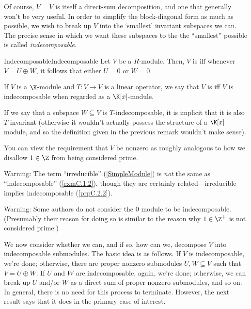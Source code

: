 Of course, $V=V$ is itself a direct-sum decomposition, and one that generally won't be very useful.  In order to simplify the block-diagonal form as much as possible, we wish to break up $V$ into the `smallest' invariant subspaces we can.  The precise sense in which we want these subspaces to the the ``smallest'' possible is called \emph{indecomposable}.
\begin{dfn}{Indecomposable}{Indecomposable}
	Let $V$ be a $R$-module.  Then, $V$ is  iff whenever $V=U\oplus W$, it follows that either $U=0$ or $W=0$.
	\begin{rmk}
		If $V$ is a $\K$-module and $T\colon V\rightarrow V$ is a linear operator, we say that $V$ is  iff $V$ is indecomposable when regarded as a $\K [x]$-module.
	\end{rmk}
	\begin{rmk}
		If we say that a subspace $W\subseteq V$ is $T$-indecomposable, it is implicit that it is also $T$-invariant (otherwise it wouldn't actually possess the structure of a $\K [x]$-module, and so the definition given in the previous remark wouldn't make sense).
	\end{rmk}
	\begin{rmk}
		You can view the requirement that $V$ be nonzero as roughly analogous to how we disallow $1\in \Z$ from being considered prime.
	\end{rmk}
	\begin{rmk}
		Warning:  The term ``irreducible'' (\cref{SimpleModule}) is \emph{not} the same as ``indecomposable'' (\cref{exmC.1.2}), though they are certainly related---irreducible implies indecomposable (\cref{prpC.2.2}).
	\end{rmk}
	\begin{rmk}
		Warning:  Some authors do not consider the $0$ module to be indecomposable.  (Presumably their reason for doing so is similar to the reason why $1\in \Z ^+$ is not considered prime.)
	\end{rmk}
\end{dfn}
We now consider whether we can, and if so, how can we, decompose $V$ into indecomposable submodules.  The basic idea is as follows.  If $V$ is indecomposable, we're done; otherwise, there are proper nonzero submodules $U,W\subseteq V$ such that $V=U\oplus W$.  If $U$ and $W$ are indecomposable, again, we're done; otherwise, we can break up $U$ and/or $W$ as a direct-sum of proper nonzero submodules, and so on.  In general, there is no need for this process to terminate.  However, the next result says that it does in the primary case of interest.
